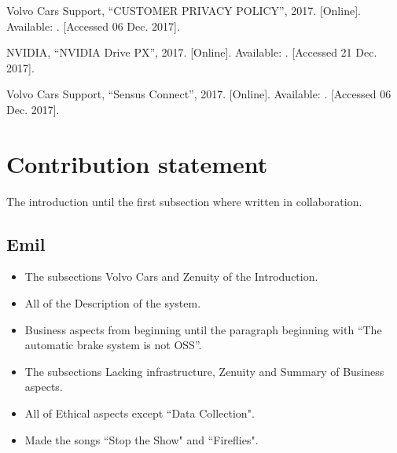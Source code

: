 \documentclass[conference]{IEEEtran}
\begin{document}
\begin{thebibliography}{00}
	Volvo Cars Support,
	``CUSTOMER PRIVACY POLICY'',
	2017.
	[Online]. Available:
	.
	[Accessed 06 Dec. 2017].
	
	NVIDIA,
	``NVIDIA Drive PX'',
	2017.
	[Online]. Available:
	.
	[Accessed 21 Dec. 2017].
	
	Volvo Cars Support,
	``Sensus Connect'',
	2017.
	[Online]. Available: .
	[Accessed 06 Dec. 2017].
	
	
\end{thebibliography}

\newpage
\appendix
\section*{Contribution statement}
The introduction until the first subsection where written in collaboration.
\subsection{Emil}
\begin{itemize}
	\item
	The subsections Volvo Cars and Zenuity of  the Introduction.
	\item
	All of the Description of the system.
	\item
	Business aspects from beginning until the paragraph beginning with ``The automatic brake system is not OSS''.
	\item
	The subsections Lacking infrastructure, Zenuity and Summary of Business aspects.
	\item
	All of Ethical aspects except ``Data Collection".
	\item
	Made the songs ``Stop the Show" and ``Fireflies".
\end{itemize}
\end{document}
